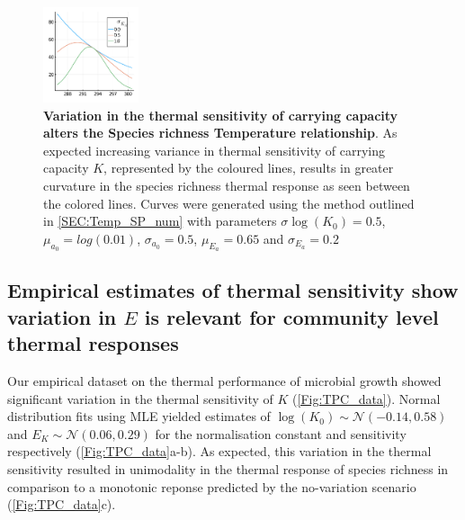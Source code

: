 \documentclass{article}
\begin{document}
\begin{figure}
    \centering
    \includegraphics[width=0.25\textwidth]{docs/Figures/Fig_Nsp_Temp_K.pdf}
    \caption{\textbf{Variation in the thermal sensitivity of carrying capacity alters the Species richness Temperature relationship}. As expected increasing variance in thermal sensitivity of carrying capacity $K$, represented by the coloured lines, results in greater curvature in the species richness thermal response as seen between the colored lines. Curves were generated using the method outlined in \cref{SEC:Temp_SP_num} with parameters $\sigma{\log(K_0)} = 0.5$, $\mu_{a_0} = log(0.01)$, $\sigma_{a_0} = 0.5$, $\mu_{E_a} = 0.65$ and $\sigma_{E_a} = 0.2$}
    \label{Fig:N_vs_T_K}
\end{figure}

\subsection*{Empirical estimates of thermal sensitivity show variation in $E$ is relevant for community level thermal responses}

Our empirical dataset on the thermal performance of microbial growth showed significant variation in the thermal sensitivity of $K$ (\cref{Fig:TPC_data}). Normal distribution fits using MLE yielded estimates of $\log(K_0) \sim \mathcal{N}(-0.14,0.58)$ and $E_K \sim \mathcal{N}(0.06,0.29)$ for the normalisation constant and sensitivity respectively (\cref{Fig:TPC_data}a-b). As expected, this variation in the thermal sensitivity resulted in unimodality in the thermal response of species richness in comparison to a monotonic reponse predicted by the no-variation scenario (\cref{Fig:TPC_data}c). 
\end{document}
